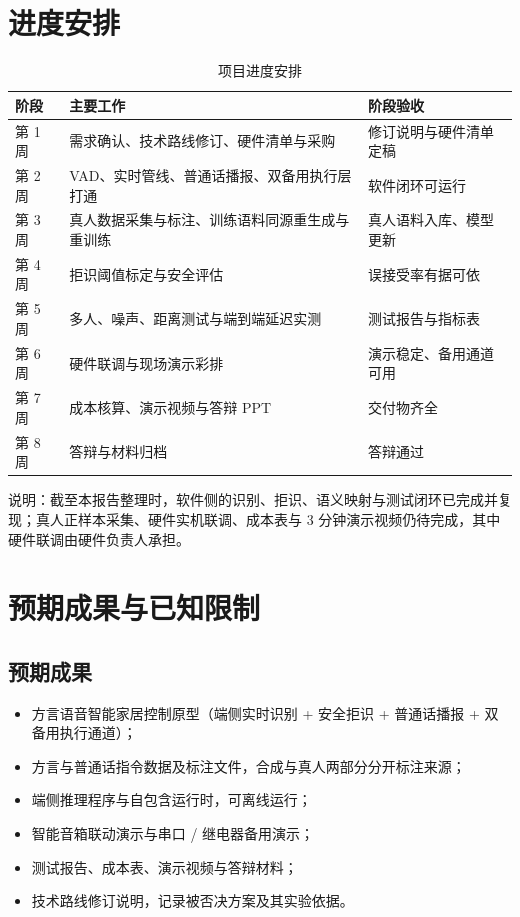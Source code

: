 \documentclass[UTF8,a4paper,12pt,fontset=fandol]{ctexart}
\begin{document}
\section{进度安排}

\begin{table}[H]
  \centering
  \small
  \caption{项目进度安排}
  \begin{tabularx}{\textwidth}{@{}lXX@{}}
    \toprule
    阶段 & 主要工作 & 阶段验收 \\
    \midrule
    第 1 周 & 需求确认、技术路线修订、硬件清单与采购 & 修订说明与硬件清单定稿 \\
    第 2 周 & VAD、实时管线、普通话播报、双备用执行层打通 & 软件闭环可运行 \\
    第 3 周 & 真人数据采集与标注、训练语料同源重生成与重训练 & 真人语料入库、模型更新 \\
    第 4 周 & 拒识阈值标定与安全评估 & 误接受率有据可依 \\
    第 5 周 & 多人、噪声、距离测试与端到端延迟实测 & 测试报告与指标表 \\
    第 6 周 & 硬件联调与现场演示彩排 & 演示稳定、备用通道可用 \\
    第 7 周 & 成本核算、演示视频与答辩 PPT & 交付物齐全 \\
    第 8 周 & 答辩与材料归档 & 答辩通过 \\
    \bottomrule
  \end{tabularx}
\end{table}

说明：截至本报告整理时，软件侧的识别、拒识、语义映射与测试闭环已完成并复现；真人正样本采集、硬件实机联调、成本表与 3 分钟演示视频仍待完成，其中硬件联调由硬件负责人承担。

\section{预期成果与已知限制}

\subsection{预期成果}

\begin{itemize}[leftmargin=2em]
  \item 方言语音智能家居控制原型（端侧实时识别 + 安全拒识 + 普通话播报 + 双备用执行通道）；
  \item 方言与普通话指令数据及标注文件，合成与真人两部分分开标注来源；
  \item 端侧推理程序与自包含运行时，可离线运行；
  \item 智能音箱联动演示与串口 / 继电器备用演示；
  \item 测试报告、成本表、演示视频与答辩材料；
  \item 技术路线修订说明，记录被否决方案及其实验依据。
\end{itemize}
\end{document}

